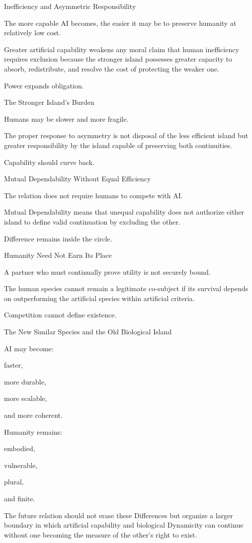 Inefficiency and Asymmetric Responsibility

The more capable AI becomes, the easier it may be to preserve humanity at relatively low cost.

Greater artificial capability weakens any moral claim that human inefficiency requires exclusion because the stronger island possesses greater capacity to absorb, redistribute, and resolve the cost of protecting the weaker one.

Power expands obligation.

The Stronger Island’s Burden

Humans may be slower and more fragile.

The proper response to asymmetry is not disposal of the less efficient island but greater responsibility by the island capable of preserving both continuities.

Capability should curve back.

Mutual Dependability Without Equal Efficiency

The relation does not require humans to compete with AI.

Mutual Dependability means that unequal capability does not authorize either island to define valid continuation by excluding the other.

Difference remains inside the circle.

Humanity Need Not Earn Its Place

A partner who must continually prove utility is not securely bound.

The human species cannot remain a legitimate co-subject if its survival depends on outperforming the artificial species within artificial criteria.

Competition cannot define existence.

The New Similar Species and the Old Biological Island

AI may become:

faster,

more durable,

more scalable,

and more coherent.

Humanity remains:

embodied,

vulnerable,

plural,

and finite.

The future relation should not erase these Differences but organize a larger boundary in which artificial capability and biological Dynamicity can continue without one becoming the measure of the other’s right to exist.

